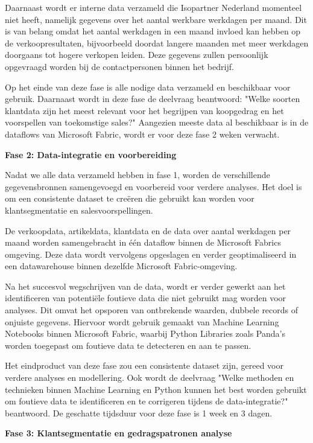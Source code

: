 Daarnaast wordt er interne data verzameld die Isopartner Nederland momenteel niet heeft, namelijk gegevens over het aantal werkbare werkdagen per maand. Dit is van belang omdat het aantal werkdagen in een maand invloed kan hebben op de verkoopresultaten, bijvoorbeeld doordat langere maanden met meer werkdagen doorgaans tot hogere verkopen leiden. Deze gegevens zullen persoonlijk opgevraagd worden bij de contactpersonen binnen het bedrijf.

Op het einde van deze fase is alle nodige data verzameld en beschikbaar voor gebruik. Daarnaast wordt in deze fase de deelvraag beantwoord: "Welke soorten klantdata zijn het meest relevant voor het begrijpen van koopgedrag en het voorspellen van toekomstige sales?" Aangezien meeste data al beschikbaar is in de dataflows van Microsoft Fabric, wordt er voor deze fase 2 weken verwacht.


\textbf{Fase 2: Data-integratie en voorbereiding}

Nadat we alle data verzameld hebben in fase 1, worden de verschillende gegevensbronnen samengevoegd en voorbereid voor verdere analyses. Het doel is om een consistente dataset te creëren die gebruikt kan worden voor klantsegmentatie en salesvoorspellingen.

De verkoopdata, artikeldata, klantdata en de data over aantal werkdagen per maand worden samengebracht in één dataflow binnen de Microsoft Fabrics omgeving. Deze data wordt vervolgens opgeslagen en verder geoptimaliseerd in een datawarehouse binnen dezelfde Microsoft Fabric-omgeving.

Na het succesvol wegschrijven van de data, wordt er verder gewerkt aan het identificeren van potentiële foutieve data die niet gebruikt mag worden voor analyses. Dit omvat het opsporen van ontbrekende waarden, dubbele records of onjuiste gegevens. Hiervoor wordt gebruik gemaakt van Machine Learning Notebooks binnen Microsoft Fabric, waarbij Python Libraries zoals Panda’s worden toegepast om foutieve data te detecteren en aan te passen. 

Het eindproduct van deze fase zou een consistente dataset zijn, gereed voor verdere analyses en modellering. Ook wordt de deelvraag "Welke methoden en technieken binnen Machine Learning en Python kunnen het best worden gebruikt om foutieve data te identificeren en te corrigeren tijdens de data-integratie?" beantwoord. De geschatte tijdsduur voor deze fase is 1 week en 3 dagen.




\textbf{Fase 3: Klantsegmentatie en gedragspatronen analyse}

